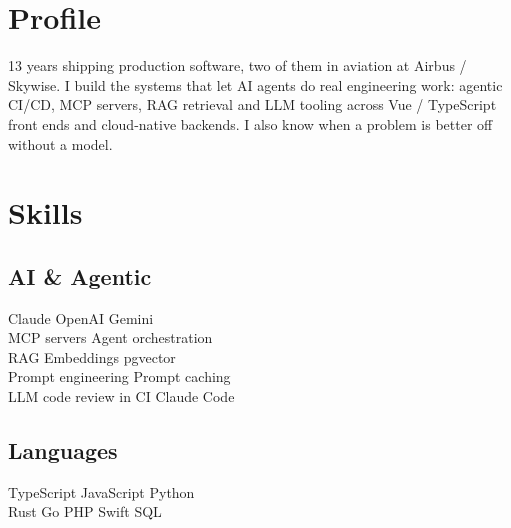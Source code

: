 \documentclass[]{pb-resume}
\begin{document}
%
%
\lastupdated

%
%

%
%

\begin{minipage}[t]{0.33\textwidth}


\section{Profile}
\raggedright 13 years shipping production software, two of them in aviation at Airbus / Skywise. I build the systems that let AI agents do real engineering work: agentic CI/CD, MCP servers, RAG retrieval and LLM tooling across Vue / TypeScript front ends and cloud-native backends. I also know when a problem is better off without a model.
\sectionsep


\section{Skills}

\subsection{AI \& Agentic}
Claude \textbullet{} OpenAI \textbullet{} Gemini \\
MCP servers \textbullet{} Agent orchestration \\
RAG \textbullet{} Embeddings \textbullet{} pgvector \\
Prompt engineering \textbullet{} Prompt caching \\
LLM code review in CI \textbullet{} Claude Code
\sectionsep

\subsection{Languages}
TypeScript \textbullet{} JavaScript \textbullet{} Python \\
Rust \textbullet{} Go \textbullet{} PHP \textbullet{} Swift \textbullet{} SQL
\sectionsep


\end{minipage}
\end{document}
